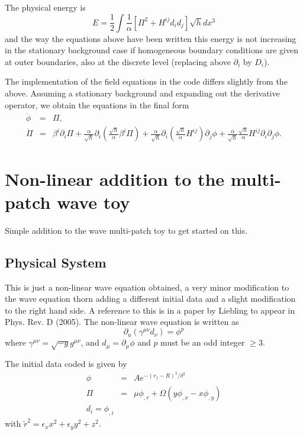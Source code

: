 \documentclass{article}
\begin{document}
The physical energy is
$$
E = \frac{1}{2}\int\frac{ 1}{\alpha }\left[ \Pi^2 + H^{ij}d_i d_j \right]\sqrt{h}dx^3
$$
and the way the equations above have been written this energy is not increasing in 
the stationary background case if homogeneous boundary 
conditions are given at outer boundaries, also at the discrete level (replacing above 
$\partial_i$ by $D_i$). 

The implementation of the field equations in the code differs slightly from the above. Assuming a
stationary background and expanding out the derivative operator, we obtain the equations in the
final form
\begin{eqnarray}
\dot{\phi } &=& \Pi, \\
\dot{\Pi} &=& \beta^i\partial_i\Pi + 
\frac{\alpha }{\sqrt{h}}\partial_i\left(\frac{\sqrt{h}}{\alpha} \beta^i\Pi \right)
+ \frac{\alpha }{\sqrt{h}}\partial_i\left(\frac{\sqrt{h}}{\alpha}H^{ij}\right) \partial_j \phi 
+ \frac{\alpha }{\sqrt{h}} \frac{\sqrt{h}}{\alpha} H^{ij} \partial_i\partial_j \phi.
\end{eqnarray}

\section{Non-linear addition to the multi-patch wave toy}

Simple addition to the wave multi-patch toy to get started on this.

\subsection{Physical System}
This is just a non-linear wave equation obtained, a very minor modification
to the wave equation thorn adding a different initial data and a slight modification
to the right hand side. A reference to this is in a paper by Liebling to appear
in Phys. Rev. D (2005).
The non-linear wave equation is written as
$$
\partial_u(\gamma^{\mu \nu}d_\nu)= \phi^p
$$
where $\gamma^{\mu \nu}=\sqrt{-g}g^{\mu \nu}$, and $d_{\mu}=\partial_{\mu }\phi$ and
$p$ must be an odd integer $\ge 3$.

The initial data coded is given by
\begin{eqnarray}
\phi &=& A e^{-(r_1 - R)^2/\delta^2} \\
\Pi &=& \mu \phi_{,r} + \Omega ( y \phi_{,x} - x \phi_{,y} ) \\
d_i = \phi_{,i}
\end{eqnarray}
with $\tilde r^2 = \epsilon_x x^2 + \epsilon_y y^2 + z^2$.
\end{document}

